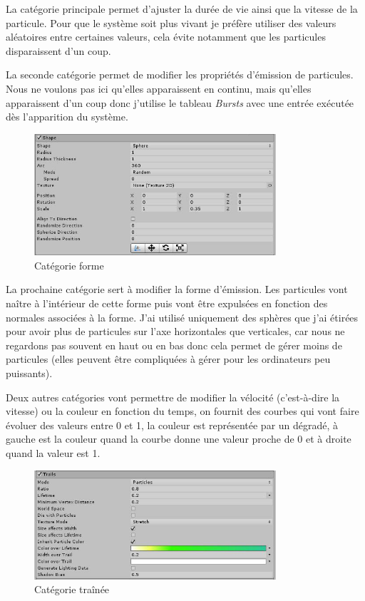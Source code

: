 \documentclass{article}
\begin{document}
La catégorie principale permet d'ajuster la durée de vie ainsi que la vitesse de la particule. Pour que le système soit plus vivant je préfère utiliser des valeurs aléatoires entre certaines valeurs, cela évite notamment que les particules disparaissent d'un coup.


La seconde catégorie permet de modifier les propriétés d'émission de particules. Nous ne voulons pas ici qu'elles apparaissent en continu, mais qu'elles apparaissent d'un coup donc j'utilise le tableau \emph{Bursts} avec une entrée exécutée dès l'apparition du système.


\begin{figure}[H]
\centering
\includegraphics[width=0.8\textwidth]{cc/particles_shape.png}
\caption{Catégorie forme}
\label{Catégorie forme}
\end{figure}


La prochaine catégorie sert à modifier la forme d'émission. Les particules vont naître à l'intérieur de cette forme puis vont être expulsées en fonction des normales associées à la forme. J'ai utilisé uniquement des sphères que j'ai étirées pour avoir plus de particules sur l'axe horizontales que verticales, car nous ne regardons pas souvent en haut ou en bas donc cela permet de gérer moins de particules (elles peuvent être compliquées à gérer pour les ordinateurs peu puissants).


Deux autres catégories vont permettre de modifier la vélocité (c'est-à-dire la vitesse) ou la couleur en fonction du temps, on fournit des courbes qui vont faire évoluer des valeurs entre 0 et 1, la couleur est représentée par un dégradé, à gauche est la couleur quand la courbe donne une valeur proche de 0 et à droite quand la valeur est 1.


\begin{figure}[H]
\centering
\includegraphics[width=0.8\textwidth]{cc/particles_trail.JPG}
\caption{Catégorie traînée}
\label{Catégorie traînée}
\end{figure}
\end{document}
